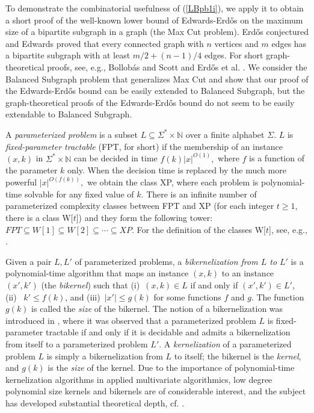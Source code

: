\documentclass{llncs}
\begin{document}
To demonstrate the combinatorial usefulness of (\ref{LBpb1i}), we apply it to obtain a short proof of the well-known lower bound of Edwards-Erd{\H o}s on the maximum size of a bipartite subgraph in a graph (the {\sc Max Cut} problem). Erd{\H o}s \cite{Erdos1965} conjectured and Edwards \cite{Edwards1975} proved that every connected graph with $n$ vertices and $m$ edges has a bipartite subgraph with at least $m/2 + (n-1)/4$ edges. For short graph-theoretical proofs, see, e.g., Bollob{\'a}s and Scott \cite{BolSco2002} and Erd{\H o}s et al. \cite{ErdGyaKoh1997}. We consider  the {\sc Balanced Subgraph} problem
\cite{BocHufTruWah2009} that generalizes {\sc Max Cut} and show that our proof of the Edwards-Erd{\H o}s bound can be easily extended to {\sc Balanced Subgraph}, but the graph-theoretical proofs of the Edwards-Erd{\H o}s bound do not seem to be easily extendable to {\sc Balanced Subgraph}.





A \emph{parameterized problem} is a subset $L\subseteq \Sigma^* \times
\mathbb{N}$ over a finite alphabet $\Sigma$. $L$ is
\emph{fixed-parameter tractable} (FPT, for short) if the membership of an instance
$(x,k)$ in $\Sigma^* \times \mathbb{N}$ can be decided in time
$f(k)|x|^{O(1)},$ where $f$ is a function of the
parameter $k$ only.
When the decision time is replaced by the much more powerful $|x|^{O(f(k))},$
we obtain the class XP, where each problem is polynomial-time solvable
for any fixed value of $k.$ There is an infinite number of parameterized complexity
classes between FPT and XP (for each integer $t\ge 1$, there is a class W[$t$]) and they form the following tower:
$FPT \subseteq W[1] \subseteq W[2] \subseteq \cdots \subseteq XP.$
For the definition of the classes W[$t$],
see, e.g., \cite{FlumGrohe06}.


Given a pair $L,L'$ of parameterized problems,
a \emph{bikernelization from $L$ to $L'$} is a polynomial-time
algorithm that maps an instance $(x,k)$ to an instance $(x',k')$ (the
\emph{bikernel}) such that (i)~$(x,k)\in L$ if and only if
$(x',k')\in L'$, (ii)~ $k'\leq f(k)$, and (iii)~$|x'|\leq g(k)$ for some
functions $f$ and $g$. The function $g(k)$ is called the {\em size} of the bikernel.
The notion of a bikernelization was introduced in \cite{AloGutKimSzeYeo11}, where it was observed that
a parameterized problem $L$ is fixed-parameter
tractable if and only if it is decidable and admits a
bikernelization from itself to a parameterized problem $L'$.
A {\em kernelization} of a parameterized problem
$L$ is simply a bikernelization from $L$ to itself; the bikernel is the {\em kernel}, and $g(k)$ is the {\em size} of
the kernel. Due to the importance of polynomial-time kernelization algorithms in applied multivariate algorithmics,
low degree polynomial size kernels and bikernels are of considerable interest, and the subject has developed
substantial theoretical depth, cf.
\cite{AloGutKimSzeYeo11,BodlaenderEtAl2009a,BodJanKra2011,BodlaenderEtAl2009,DLS09,FlumGrohe06,FomLokMisPhiSau2011,GutIerMniYeo,GutKimSzeYeo11}.
\end{document}
